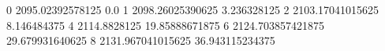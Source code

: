0 2095.02392578125 0.0
1 2098.26025390625 3.236328125
2 2103.17041015625 8.146484375
4 2114.8828125 19.85888671875
6 2124.703857421875 29.679931640625
8 2131.967041015625 36.943115234375
